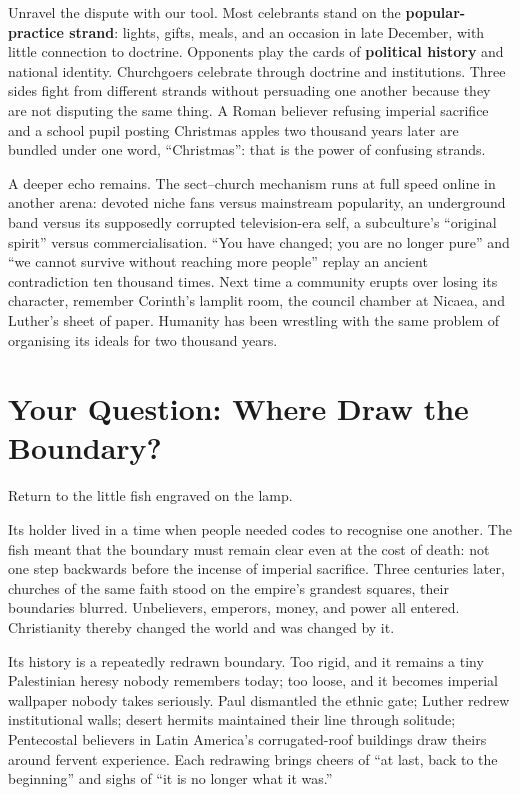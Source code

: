 Unravel the dispute with our tool. Most celebrants stand on the \textbf{popular-practice strand}: lights, gifts, meals, and an occasion in late December, with little connection to doctrine. Opponents play the cards of \textbf{political history} and national identity. Churchgoers celebrate through doctrine and institutions. Three sides fight from different strands without persuading one another because they are not disputing the same thing. A Roman believer refusing imperial sacrifice and a school pupil posting Christmas apples two thousand years later are bundled under one word, ``Christmas'': that is the power of confusing strands.

A deeper echo remains. The sect--church mechanism runs at full speed online in another arena: devoted niche fans versus mainstream popularity, an underground band versus its supposedly corrupted television-era self, a subculture's ``original spirit'' versus commercialisation. ``You have changed; you are no longer pure'' and ``we cannot survive without reaching more people'' replay an ancient contradiction ten thousand times. Next time a community erupts over losing its character, remember Corinth's lamplit room, the council chamber at Nicaea, and Luther's sheet of paper. Humanity has been wrestling with the same problem of organising its ideals for two thousand years.

\section{Your Question: Where Draw the Boundary?}
Return to the little fish engraved on the lamp.

Its holder lived in a time when people needed codes to recognise one another. The fish meant that the boundary must remain clear even at the cost of death: not one step backwards before the incense of imperial sacrifice. Three centuries later, churches of the same faith stood on the empire's grandest squares, their boundaries blurred. Unbelievers, emperors, money, and power all entered. Christianity thereby changed the world and was changed by it.

Its history is a repeatedly redrawn boundary. Too rigid, and it remains a tiny Palestinian heresy nobody remembers today; too loose, and it becomes imperial wallpaper nobody takes seriously. Paul dismantled the ethnic gate; Luther redrew institutional walls; desert hermits maintained their line through solitude; Pentecostal believers in Latin America's corrugated-roof buildings draw theirs around fervent experience. Each redrawing brings cheers of ``at last, back to the beginning'' and sighs of ``it is no longer what it was.''

